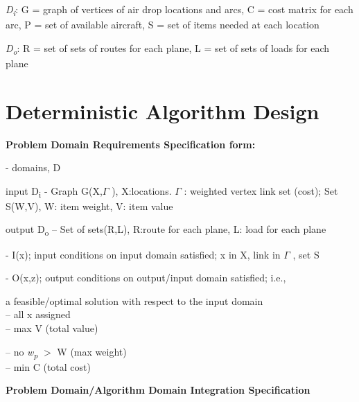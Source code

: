 \documentclass[journal]{IEEEtran}
\begin{document}
\textit{D\textsubscript{i}}: G = graph of vertices of air drop locations and arcs, C = cost matrix for each arc, P = set of available aircraft, S = set of items needed at each location\par

\textit{D\textsubscript{o}}: R = set of sets of routes for each plane, L = set of sets of loads for each plane\par





\section{Deterministic Algorithm Design}

\setlength{\parskip}{18.12pt}
\textbf{Problem Domain Requirements Specification form:}\par

\setlength{\parskip}{8.04pt}
- domains, D \par

\tab input D\textsubscript{i }- Graph G(X,$ \Gamma $ ), X:locations. $ \Gamma $ : weighted vertex link set (cost); Set S(W,V), W: item weight, V: item value\par

\tab output D\textsubscript{o }– Set of sets(R,L), R:route for each plane, L: load for each plane\par

- I(x); input conditions on input domain satisﬁed; x in X, link in $ \Gamma $ , set S \par

- O(x,z); output conditions on output/input domain satisﬁed; i.e., \par

\setlength{\parskip}{18.12pt}
\tab a feasible/optimal solution with respect to the input domain \\
-- all x assigned\\
-- max V (total value)\par

-- no \textit{w\textsubscript{p}  }$>$ W (max weight)\\
-- min C (total cost)\  \par

\setlength{\parskip}{8.04pt}
\textbf{Problem Domain/Algorithm Domain Integration Specification\\
}\par
\end{document}
